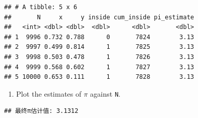 \documentclass[
]{article}
\newenvironment{Shaded}{\begin{snugshade}}{\end{snugshade}}
\newcommand{\DecValTok}[1]{\textcolor[rgb]{0.00,0.00,0.81}{#1}}
\newcommand{\FunctionTok}[1]{\textcolor[rgb]{0.13,0.29,0.53}{\textbf{#1}}}
\newcommand{\NormalTok}[1]{#1}
\newcommand{\OtherTok}[1]{\textcolor[rgb]{0.56,0.35,0.01}{#1}}
\newcommand{\SpecialCharTok}[1]{\textcolor[rgb]{0.81,0.36,0.00}{\textbf{#1}}}
\newcommand{\StringTok}[1]{\textcolor[rgb]{0.31,0.60,0.02}{#1}}
\providecommand{\tightlist}{%
  \setlength{\itemsep}{0pt}\setlength{\parskip}{0pt}}
\begin{document}
\begin{verbatim}
## # A tibble: 5 x 6
##       N     x     y inside cum_inside pi_estimate
##   <int> <dbl> <dbl>  <dbl>      <dbl>       <dbl>
## 1  9996 0.732 0.788      0       7824        3.13
## 2  9997 0.499 0.814      1       7825        3.13
## 3  9998 0.503 0.478      1       7826        3.13
## 4  9999 0.568 0.602      1       7827        3.13
## 5 10000 0.653 0.111      1       7828        3.13
\end{verbatim}

\begin{enumerate}
\def\labelenumi{\alph{enumi}.}
\setcounter{enumi}{1}
\tightlist
\item
  Plot the estimates of \(\pi\) against \texttt{N}.
\end{enumerate}

\begin{Shaded}
\end{Shaded}

\begin{verbatim}
## 最终π估计值: 3.1312
\end{verbatim}
\end{document}
